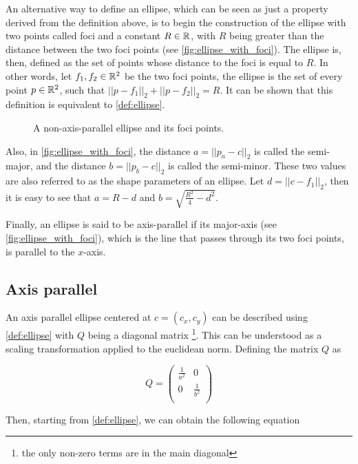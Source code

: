 An alternative way to define an ellipse, which can be seen as just a property derived from the definition above, is to begin the construction of the ellipse with two points called foci and a constant $R \in \mathbb{R}$, with $R$ being greater than the distance between the two foci points (see \autoref{fig:ellipse_with_foci}). The ellipse is, then, defined as the set of points whose distance to the foci is equal to $R$. In other words, let $f_1, f_2 \in \mathbb{R}^2$ be the two foci points, the ellipse is the set of every point $p \in \mathbb{R}^2$, such that $||p-f_1||_2 + ||p-f_2||_2 = R$. It can be shown that this definition is equivalent to \autoref{def:ellipse}.

\begin{figure}[H]
    \centering
    
    \caption{A non-axis-parallel ellipse and its foci points.}
    
    \fautor
    \label{fig:ellipse_with_foci}
\end{figure}

Also, in \autoref{fig:ellipse_with_foci}, the distance $a = ||p_a - c||_2$ is called the semi-major, and the distance $b = ||p_b-c||_2$ is called the semi-minor. These two values are also referred to as the shape parameters of an ellipse. Let $d = ||c-f_1||_2$, then it is easy to see that $a = R - d$ and $b = \sqrt{\frac{R^2}{4} - d^2}$.

Finally, an ellipse is said to be axis-parallel if its major-axis (see \autoref{fig:ellipse_with_foci}), which is the line that passes through its two foci points, is parallel to the $x$-axis.

\subsection{Axis parallel}

An axis parallel ellipse centered at $c = (c_x,c_y)$ can be described using \autoref{def:ellipse} with $Q$ being a diagonal matrix \footnote{the only non-zero terms are in the main diagonal}. This can be understood as a scaling transformation applied to the euclidean norm.
Defining the matrix $Q$ as

\[
Q=
\left( {\begin{array}{cc}
    \frac{1}{a^2} & 0 \\
    0 & \frac{1}{b^2} \\
    \end{array} } \right)
\]

Then, starting from \autoref{def:ellipse}, we can obtain the following equation

